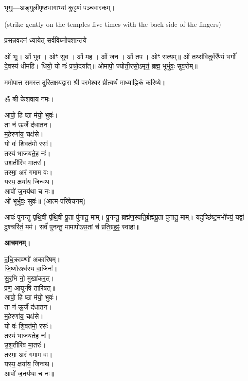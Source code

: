 
भृगुः—अङ्गुलीपृष्ठभागाभ्यां कुट्टणं पञ्चवारकम्।

{\scriptsize (strike gently on the temples five times with the back side of the fingers)}

{प्रसन्नवदनं ध्यायेत् सर्वविघ्नोपशान्तये}


ओं भूः। ओं भुव। ओꣳ सुव। ओं मह। ओं जन। ओं तप। ओꣳ स॒त्यम्॥
ओं तथ्स॑वि॒तुर्वरे᳚ण्यं॒ भर्गो॑ दे॒वस्य॑ धीमहि। धियो॒ यो नः॑ प्रचो॒दया᳚त्॥
ओमापो॒ ज्योती॒रसो॒ऽमृतं॒ ब्रह्म॒ भूर्भुवः॒ सुव॒रोम्॥


ममोपात्त समस्त दुरितक्षयद्वारा श्री परमेश्वर प्रीत्यर्थं माध्याह्निकं करिष्ये।


ॐ श्री केशवाय नमः।

आपो॒ हि ष्ठा म॑यो॒ भुवः॑।\\
ता न॑ ऊ॒र्जे द॑धातन।\\
म॒हेरणा॑य॒ चक्ष॑से।\\
यो वः॑ शि॒वत॑मो॒ रसः॑।\\
तस्य॑ भाजयते॒ह नः॑।\\
उ॒श॒तीरि॑व मा॒तरः॑।\\
तस्मा॒ अरं॑ गमाम वः।\\
यस्य॒ क्षया॑य॒ जिन्व॑थ।\\
आपो॑ ज॒नय॑था च नः॥\\

ओं भूर्भुवः॒ सुवः॑॥ (आत्म-परिषेचनम्)


आपः॑ पुनन्तु पृथि॒वीं पृ॑थि॒वी पू॒ता पु॑नातु॒ माम्। पु॒नन्तु॒ ब्रह्म॑ण॒स्पति॒र्ब्रह्म॑पू॒ता पु॑नातु॒ माम्। यदुच्छि॑ष्ट॒मभो᳚ज्यं॒ यद्वा॑ दु॒श्चरि॑तं॒ मम॑। सर्वं॑ पुनन्तु॒ मामापो॑ऽस॒तां च॑ प्रति॒ग्रह॒ꣴ॒ स्वाहा᳚॥


\textbf{आचमनम्।}

द॒धि॒क्राव्ण्णो॑ अकारिषम्।\\
 जि॒ष्णोरश्व॑स्य वा॒जिनः॑।\\
सु॒र॒भि नो॒ मुखा॑कर॒त्।\\
प्रण॒ आयूꣳ॑षि तारिषत्॥\\



आपो॒ हि ष्ठा म॑यो॒ भुवः॑।\\
ता न॑ ऊ॒र्जे द॑धातन।\\
म॒हेरणा॑य॒ चक्ष॑से।\\
यो वः॑ शि॒वत॑मो॒ रसः॑।\\
तस्य॑ भाजयते॒ह नः॑।\\
उ॒श॒तीरि॑व मा॒तरः॑।\\
तस्मा॒ अरं॑ गमाम वः।\\
यस्य॒ क्षया॑य॒ जिन्व॑थ।\\
आपो॑ ज॒नय॑था च नः॥\\

